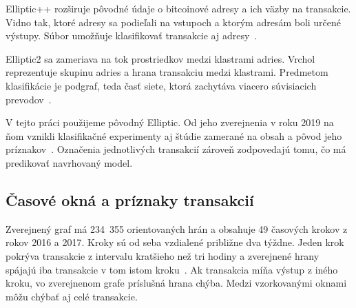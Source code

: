 Elliptic++ rozširuje pôvodné údaje o bitcoinové adresy a ich
väzby na transakcie. Vidno tak, ktoré adresy sa podieľali na
vstupoch a ktorým adresám boli určené výstupy. Súbor umožňuje
klasifikovať transakcie aj adresy~\cite{elmougy2023ellipticpp}.

Elliptic2 sa zameriava na tok prostriedkov medzi klastrami adries.
Vrchol reprezentuje skupinu adries a hrana transakciu medzi
klastrami. Predmetom klasifikácie je podgraf, teda časť siete,
ktorá zachytáva viacero súvisiacich prevodov~\cite{bellei2024elliptic2}.

V tejto práci použijeme pôvodný Elliptic. Od jeho zverejnenia v roku
2019 na ňom vznikli klasifikačné experimenty aj štúdie zamerané na
obsah a pôvod jeho príznakov~\cite{weber2019elliptic,safar2026elliptic}.
Označenia jednotlivých transakcií zároveň zodpovedajú tomu, čo
má predikovať navrhovaný model.

\subsection{Časové okná a príznaky transakcií}

Zverejnený graf má 234~355 orientovaných hrán a obsahuje 49
časových krokov z rokov 2016 a 2017. Kroky sú od seba vzdialené
približne dva týždne. Jeden krok pokrýva transakcie z intervalu
kratšieho než tri hodiny a zverejnené hrany spájajú iba transakcie
v tom istom kroku~\cite{weber2019elliptic,safar2026elliptic}.
Ak transakcia míňa výstup z iného kroku, vo zverejnenom grafe
príslušná hrana chýba. Medzi vzorkovanými oknami môžu chýbať aj
celé transakcie.

\begin{center}
  \begin{minipage}{\textwidth}
  \captionsetup{type=figure}
  \centering
  \caption{Príklad hrán vnútri časového kroku a na jeho hranici.}
  \label{fig:elliptic-window}
  \end{minipage}
\end{center}

